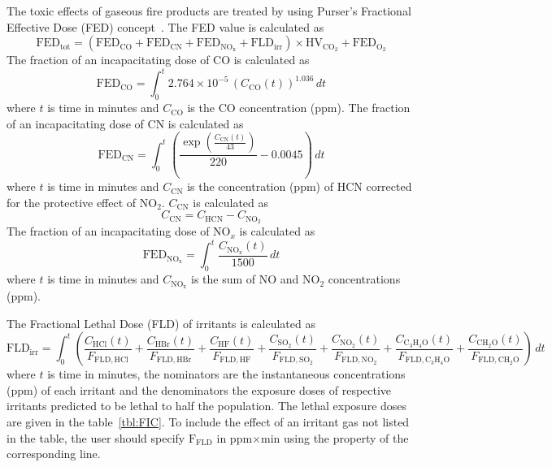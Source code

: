 \documentclass[12pt,a4paper,final,twoside]{stylevk}
\begin{document}

The toxic effects of gaseous fire products are treated by using
Purser's Fractional Effective Dose (FED) concept~\cite{Purser03}.  
The FED value is calculated as
%
\begin{equation}
  \mathrm{FED}_\mathrm{tot} = (\mathrm{FED}_\mathrm{CO} +
  \mathrm{FED}_\mathrm{CN} + \mathrm{FED}_\mathrm{NO_x} +
  \mathrm{FLD}_\mathrm{irr}) \times \mathrm{HV}_\mathrm{CO_2} +
  \mathrm{FED}_\mathrm{O_2}
\end{equation}
%
The fraction of an incapacitating dose of CO is calculated as
%
\begin{equation}
  \mathrm{FED}_\mathrm{CO} = \int_0^t 2.764 \times 10^{-5} \,
  (C_\mathrm{CO}(t))^{1.036} \, dt
\end{equation}
%
where $t$ is time in minutes and $C_\mathrm{CO}$ is the CO
concentration (ppm).  The fraction of an incapacitating dose of CN is
calculated as
%
\begin{equation}
  \mathrm{FED}_\mathrm{CN} = \int_0^t \left( \frac{\exp\left(
        \frac{C_\mathrm{CN}(t)}{43} \right)}{220} - 0.0045 \right) \,
  dt
\end{equation}
%
where $t$ is time in minutes and $C_\mathrm{CN}$ is the concentration
(ppm) of HCN corrected for the protective effect of NO$_\mathrm{2}$.
$C_\mathrm{CN}$ is calculated as
%
\begin{equation}
  C_\mathrm{CN} = C_\mathrm{HCN} - C_\mathrm{NO_2}
\end{equation}
%
The fraction of an incapacitating dose of NO$_x$ is calculated as
%
\begin{equation}
\mathrm{FED}_\mathrm{NO_x} = \int_0^t \frac{C_\mathrm{NO_x}(t)}{1500} \, dt
\end{equation}
%
where $t$ is time in minutes and $C_\mathrm{NO_x}$ is the sum of NO
and NO$_\mathrm{2}$ concentrations (ppm).

The Fractional Lethal Dose (FLD) of irritants is calculated as
%
\begin{equation}
  \mathrm{FLD}_\mathrm{irr} = \int_0^t \left(
    \frac{C_\mathrm{HCl}(t)}    {F_\mathrm{FLD,HCl}} +
    \frac{C_\mathrm{HBr}(t)}    {F_\mathrm{FLD,HBr}} +
    \frac{C_\mathrm{HF}(t)}     {F_\mathrm{FLD,HF}} +
    \frac{C_\mathrm{SO_2}(t)}   {F_\mathrm{FLD,SO_2}} +
    \frac{C_\mathrm{NO_2}(t)}   {F_\mathrm{FLD,NO_2}} +
    \frac{C_\mathrm{C_3H_4O}(t)}{F_\mathrm{FLD,C_3H_4O}} +
    \frac{C_\mathrm{CH_2O}(t)}  {F_\mathrm{FLD,CH_2O}}
    \right) \, dt
\end{equation}
%
where $t$ is time in minutes, the nominators are the instantaneous
concentrations (ppm) of each irritant and the denominators the
exposure doses of respective irritants predicted to be lethal to half
the population.  The lethal exposure doses~\cite{Purser03} are given
in the table~\ref{tbl:FIC}.  To include the effect of an irritant gas
not listed in the table, the user should specify $\mathrm{F_{FLD}}$ in
ppm$\times$min using the  property of the
corresponding  line.
\end{document}
